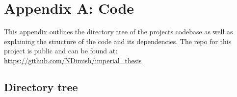 \documentclass[11pt,a4paper]{article}
\begin{document}
\newpage



\newpage

\section{Appendix A: Code}

This appendix outlines the directory tree of the projects codebase as well as explaining the structure of the code and its dependencies.
The repo for this project is public and can be found at: \url{https://github.com/NDimish/imperial\_thesis}

\subsection{Directory tree}
\end{document}
